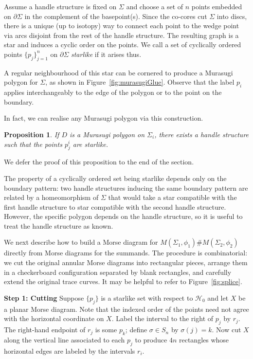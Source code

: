 \documentclass{amsart}
\newtheorem{proposition}[theorem]{Proposition}
\theoremstyle{definition}
\begin{document}
Assume a handle structure is fixed on $\Sigma$ and choose a set of $n$ points embedded on  $\partial \Sigma$ in the complement of the basepoint(s).  Since the co-cores cut $\Sigma$ into discs, there is a unique (up to isotopy) way to connect each point to the wedge point via arcs disjoint from the rest of the handle structure.  The resulting graph is a star and induces a cyclic order on the points.   We call a set of cyclically ordered points $\{p_j\}_{j=1}^n$ on $\partial \Sigma$ \textit{starlike} if it arises thus.

A regular neighbourhood of this star can be  cornered to produce a Murasugi polygon for $\Sigma$, as shown in Figure~\ref{fig:murasugiGlue}.  Observe that the label $p_i$ applies interchangeably to the edge of the polygon or to the point on the boundary.  

In fact, we can realise any Murasugi polygon via this construction.


\begin{proposition}\label{prop:MakeNice} 
If $D$ is a Murasugi polygon on $\Sigma_i$, there exists a handle structure such that the points $p_j^i$ are starlike.   
\end{proposition}

We defer the proof of this proposition to the end of the section.

The property of a cyclically ordered set being starlike depends only on the boundary pattern:  two handle structures inducing the same boundary pattern are related by a homeomorphism of $\Sigma$ that would take a star compatible with the first handle structure to star compatible with the second handle structure.  However, the specific polygon  depends on the handle structure, so it is useful to treat the handle structure as known.

We next describe how to build a Morse diagram for $M(\Sigma_1,\phi_1)\#M(\Sigma_2, \phi_2)$ directly from Morse diagrams for the summands. The procedure is combinatorial: we cut the original annular Morse diagrams into rectangular pieces,  arrange them in a checkerboard configuration  separated by blank rectangles, and  carefully extend the original trace curves.    It may be helpful to refer to Figure~\ref{fig:splice}.

\textbf{Step 1: Cutting}
Suppose $\{p_j\}$ is a starlike set with respect to $\mathcal{H}_0$ and let $X$ be a planar Morse diagram.  Note that the indexed order of the points need not agree with the horizontal coordinate on $X$.  Label the interval to the right of $p_j$ by $r_j$.   The right-hand endpoint of $r_j$ is some $p_k$; define $\sigma\in S_n$ by $\sigma(j)=k$.  Now cut $X$ along the vertical line associated to each $p_j$ to produce  $4n$ rectangles whose horizontal edges are labeled by the intervals $r_i$.  
\end{document}
